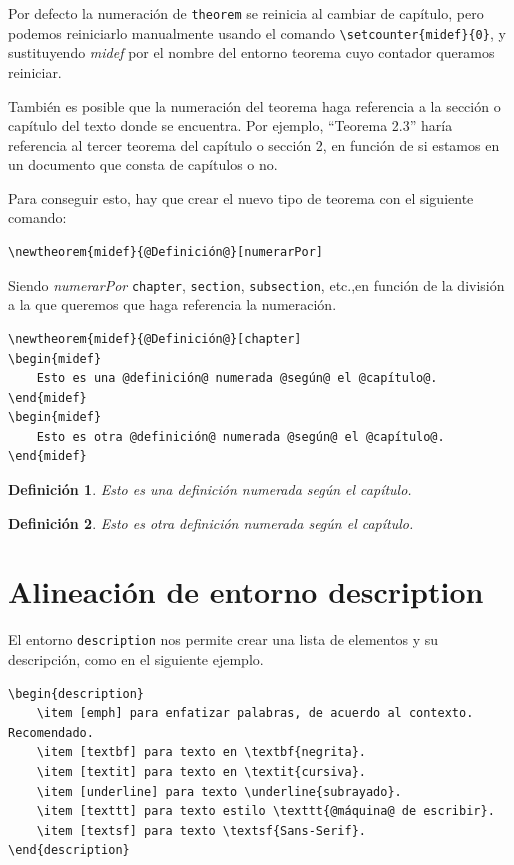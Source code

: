 \documentclass[12pt,a4paper, oneside]{report}
\begin{document}
Por defecto la numeración de \verb+theorem+ se reinicia al cambiar de capítulo, pero podemos reiniciarlo manualmente usando el comando \verb+\setcounter{midef}{0}+, y sustituyendo \emph{midef} por el nombre del entorno teorema cuyo contador queramos reiniciar.

También es posible que la numeración del teorema haga referencia a la sección o capítulo del texto donde se encuentra. Por ejemplo, ``Teorema 2.3'' haría referencia al tercer teorema del capítulo o sección 2, en función de si estamos en un documento que consta de capítulos o no.

Para conseguir esto, hay que crear el nuevo tipo de teorema con el siguiente comando:

\begin{lstlisting}
\newtheorem{midef}{@Definición@}[numerarPor]
\end{lstlisting}

Siendo \emph{numerarPor} \texttt{chapter}, \texttt{section}, \texttt{subsection}, etc.,en función de la división a la que queremos que haga referencia la numeración. 

\begin{lstlisting}
\newtheorem{midef}{@Definición@}[chapter]
\begin{midef}
	Esto es una @definición@ numerada @según@ el @capítulo@.
\end{midef}
\begin{midef}
	Esto es otra @definición@ numerada @según@ el @capítulo@.
\end{midef}
\end{lstlisting}

\newtheorem{midef}{Definición}[chapter]
\begin{midef}
	Esto es una definición numerada según el capítulo.
\end{midef}
\begin{midef}
	Esto es otra definición numerada según el capítulo.
\end{midef}

\section{Alineación de entorno description}

El entorno \verb+description+ nos permite crear una lista de elementos y su descripción, como en el siguiente ejemplo.

\begin{lstlisting}
\begin{description}
	\item [emph] para enfatizar palabras, de acuerdo al contexto. Recomendado.
	\item [textbf] para texto en \textbf{negrita}.
	\item [textit] para texto en \textit{cursiva}.
	\item [underline] para texto \underline{subrayado}.
	\item [texttt] para texto estilo \texttt{@máquina@ de escribir}.
	\item [textsf] para texto \textsf{Sans-Serif}.
\end{description}
\end{lstlisting}
\end{document}
